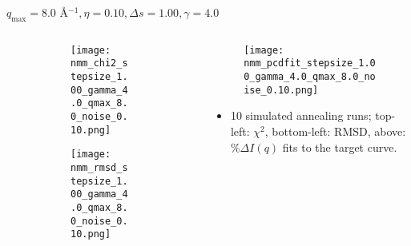\documentclass{beamer}
\begin{document}
\begin{frame}{$ q_{\textrm{max}}=8.0 $ \AA $^{-1}, \eta=0.10, \Delta s=1.00, \gamma=4.0$}
	\begin{columns}
		\begin{column}{.5\textwidth}
			\begin{figure}[H]
			\centering
			\begin{subfigure}[b]{\textwidth}
				\centering
				\texttt{[image: nmm\_chi2\_stepsize\_1.00\_gamma\_4.0\_qmax\_8.0\_noise\_0.10.png]}
				\label{fig:}
			\end{subfigure}
			\begin{subfigure}[b]{\textwidth}
				\centering
				\texttt{[image: nmm\_rmsd\_stepsize\_1.00\_gamma\_4.0\_qmax\_8.0\_noise\_0.10.png]}
				\label{fig:}
			\end{subfigure}
			\end{figure}
		\end{column}
		\begin{column}{.5\textwidth}
			\begin{figure}[H]
				\centering
				\texttt{[image: nmm\_pcdfit\_stepsize\_1.00\_gamma\_4.0\_qmax\_8.0\_noise\_0.10.png]}
				\label{fig:}
			\end{figure}
			\begin{itemize}
				\item 10 simulated annealing runs; top-left: $\chi^2$, bottom-left: RMSD, above: $\%\Delta I(q)$ fits to the target curve.
			\end{itemize}
		\end{column}
	\end{columns}
\end{frame}
 
\end{document}

